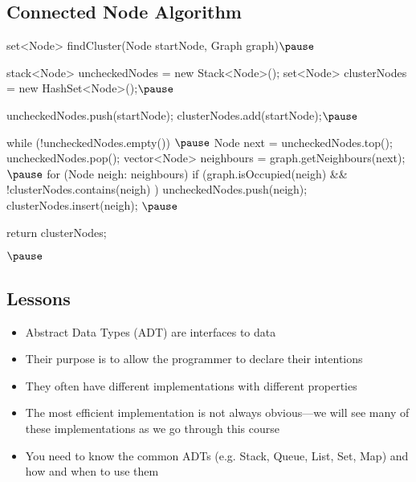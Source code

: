 \begin{slide}
\section[-1]{Connected Node Algorithm}

\begin{java}
set<Node> findCluster(Node startNode, Graph graph)$\pause$
{
  stack<Node> uncheckedNodes = new Stack<Node>();
  set<Node> clusterNodes = new HashSet<Node>();$\pause$

  uncheckedNodes.push(startNode);
  clusterNodes.add(startNode);$\pause$

  while (!uncheckedNodes.empty()) {$\pause$
    Node next = uncheckedNodes.top();   uncheckedNodes.pop();
    vector<Node> neighbours = graph.getNeighbours(next);$\pause$
    for (Node neigh: neighbours) {
      if (graph.isOccupied(neigh) && !clusterNodes.contains(neigh) ) {
        uncheckedNodes.push(neigh);
        clusterNodes.insert(neigh);
      }
    }$\pause$
  }

  return clusterNodes;
}$\pause$
\end{java}
\end{slide}



\begin{slide}
\section{Lessons}

\begin{PauseHighLight}
  \begin{itemize}
  \item Abstract Data Types (ADT) are interfaces to data\pause
  \item Their purpose is to allow the programmer to declare their
    intentions\pause
  \item They often have different implementations with different
    properties\pause
  \item The most efficient implementation is not always
    obvious\pause---we will see many of these implementations as we go
    through this course\pause
  \item You need to know the common ADTs (e.g. Stack, Queue, List, Set,
    Map) and how and when to use them\pause
  \end{itemize}
\end{PauseHighLight}
\end{slide}

